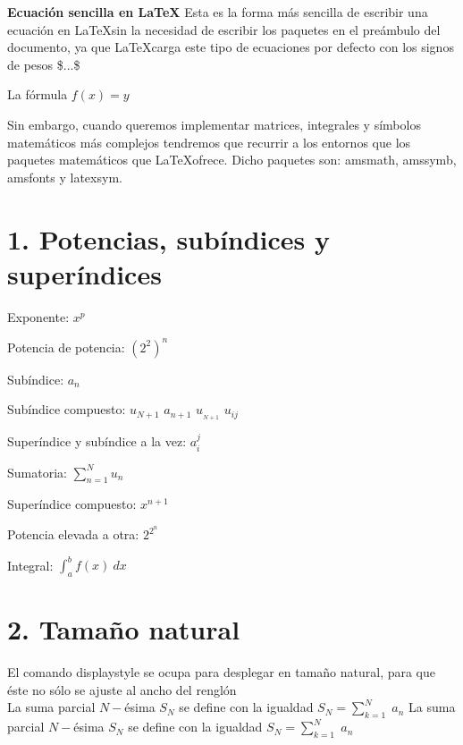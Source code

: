 \documentclass{article} %
\begin{document}
  
\textbf{Ecuaci\'on sencilla en \LaTeX}
Esta es la forma más sencilla de escribir una ecuaci\'on en \LaTeX sin la
necesidad de escribir los paquetes en el pre\'ambulo del documento, ya que
\LaTeX carga este tipo de ecuaciones por defecto
con los signos de pesos \$...\$ 

La fórmula $ f(x) = y $

Sin embargo, cuando queremos implementar matrices, integrales y s\'imbolos
matem\'aticos m\'as complejos tendremos que recurrir a los entornos que los
paquetes matem\'aticos que \LaTeX ofrece.
Dicho paquetes son: amsmath, amssymb, amsfonts y latexsym.

\section*{1. Potencias, sub\'indices y super\'indices}
Exponente: $x^p$

Potencia de potencia: $(2^2)^n$

Sub\'indice: $a_n$

Sub\'indice compuesto: $u_{N + 1}$ $a_{n+1}$ $u_{_{N+1}}$ $u_{ij}$

Super\'indice y sub\'indice a la vez: $a_i^j$

Sumatoria: $\sum_{n = 1}^{N}u_n$

Super\'indice compuesto: $x^{n+1}$

Potencia elevada a otra: $2^{2^n}$

Integral: $\int_a^b f(x)\ dx$


\section*{2. Tamaño natural}

El comando displaystyle se ocupa para desplegar en tamaño 
natural, para que éste no s\'olo se ajuste al ancho del rengl\'on \\
La suma parcial $N-$ésima $S_N$ se define con la igualdad $S_N=\sum_{k=1}^{N} \; a_n$
La suma parcial $N-$ésima $S_N$ se define con la igualdad $\displaystyle
S_N=\sum_{k=1}^{N} \; a_n$
\end{document}

